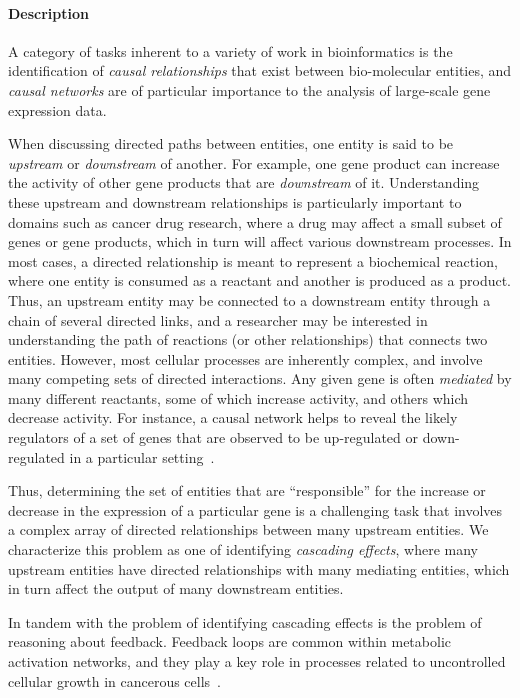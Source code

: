 \documentclass[twocolumn]{bmcart}%
\begin{document}
\paragraph*{Description}

A category of tasks inherent to a variety of work in bioinformatics is the identification of \textit{causal relationships} that exist between bio-molecular entities, and \emph{causal networks} are of particular importance to the analysis of large-scale gene expression data.

When discussing directed paths between entities, one entity is said to be \emph{upstream} or \emph{downstream} of another.
For example, one gene product can increase the activity of other gene products that are \emph{downstream} of it.
Understanding these upstream and downstream relationships is particularly important to domains such as cancer drug research, where a drug may affect a small subset of genes or gene products, which in turn will affect various downstream processes.
In most cases, a directed relationship is meant to represent a biochemical reaction, where one entity is consumed as a reactant and another is produced as a product.
Thus, an upstream entity may be connected to a downstream entity through a chain of several directed links, and a researcher may be interested in understanding the path of reactions (or other relationships) that connects two entities.
However, most cellular processes are inherently complex, and involve many competing sets of directed interactions.
Any given gene is often \textit{mediated} by many different reactants, some of which increase activity, and others which decrease activity.
For instance, a causal network helps to reveal the likely regulators of a set of genes that are observed to be up-regulated or down-regulated in a particular setting~\cite{felciano2013predictive, Kramer2013ipa-causal}.

Thus, determining the set of entities that are ``responsible'' for the increase or decrease in the expression of a particular gene is a challenging task that involves a complex array of directed relationships between many upstream entities.
We characterize this problem as one of identifying \textit{cascading effects}, where many upstream entities have directed relationships with many mediating entities, which in turn affect the output of many downstream entities.

In tandem with the problem of identifying cascading effects is the problem of reasoning about feedback.
Feedback loops are common within metabolic activation networks, and they play a key role in processes related to uncontrolled cellular growth in cancerous cells~\cite{cairns2011regulation}.
\end{document}
